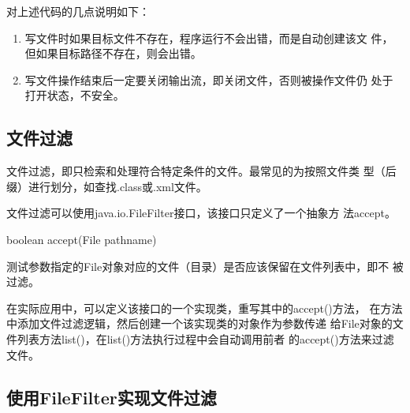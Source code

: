 对上述代码的几点说明如下：

\begin{enumerate}
\item 写文件时如果目标文件不存在，程序运行不会出错，而是自动创建该文
  件，但如果目标路径不存在，则会出错。
\item 写文件操作结束后一定要关闭输出流，即关闭文件，否则被操作文件仍
  处于打开状态，不安全。
\end{enumerate}

\subsection{文件过滤}

文件过滤，即只检索和处理符合特定条件的文件。{\kai 最常见的为按照文件类
  型（后缀）进行划分，如查找.class或.xml文件。}

文件过滤可以使用java.io.FileFilter接口，该接口只定义了一个抽象方
法accept。

\begin{javaCode}
  boolean accept(File pathname)  
\end{javaCode}

测试参数指定的File对象对应的文件（目录）是否应该保留在文件列表中，即不
被过滤。

{\kai 在实际应用中，可以定义该接口的一个实现类，重写其中的accept()方法，
  在方法中添加文件过滤逻辑，然后创建一个该实现类的对象作为参数传递
  给File对象的文件列表方法list()，在list()方法执行过程中会自动调用前者
  的accept()方法来过滤文件。}

\subsection{使用FileFilter实现文件过滤}


